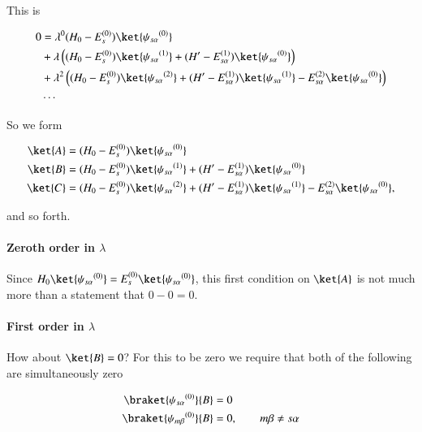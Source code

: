 This is

\begin{equation}\label{eqn:qmTwoL5a:420}
\begin{aligned}
0 &=
\lambda^0
(H_0 - E_s^{(0)}) \ket{{\psi_{s \alpha}}^{(0)}}  \\
&+ \lambda
\left(
(H_0 - E_s^{(0)}) \ket{{\psi_{s \alpha}}^{(1)}} 
+(H' - E_{s \alpha}^{(1)}) \ket{{\psi_{s \alpha}}^{(0)}} 
\right) \\
&+ \lambda^2
\left(
(H_0 - E_s^{(0)}) \ket{{\psi_{s \alpha}}^{(2)}} 
+(H' - E_{s \alpha}^{(1)}) \ket{{\psi_{s \alpha}}^{(1)}} 
-E_{s \alpha}^{(2)} \ket{{\psi_{s \alpha}}^{(0)}} 
\right) \\
&\cdots
\end{aligned}
\end{equation}

So we form

\begin{align}\label{eqn:qmTwoL5a:440}
\ket{A} &=
(H_0 - E_s^{(0)}) \ket{{\psi_{s \alpha}}^{(0)}} \\
\ket{B} &=
(H_0 - E_s^{(0)}) \ket{{\psi_{s \alpha}}^{(1)}} 
+(H' - E_{s \alpha}^{(1)}) \ket{{\psi_{s \alpha}}^{(0)}} \\
\ket{C} &=
(H_0 - E_s^{(0)}) \ket{{\psi_{s \alpha}}^{(2)}} 
+(H' - E_{s \alpha}^{(1)}) \ket{{\psi_{s \alpha}}^{(1)}} 
-E_{s \alpha}^{(2)} \ket{{\psi_{s \alpha}}^{(0)}},
\end{align}

and so forth.

\paragraph{Zeroth order in $\lambda$}

Since $H_0 \ket{{\psi_{s \alpha}}^{(0)}} = E_s^{(0)} \ket{{\psi_{s \alpha}}^{(0)}}$, this first condition on $\ket{A}$ is not much more than a statement that $0 - 0 = 0$.  

\paragraph{First order in $\lambda$}

How about $\ket{B} = 0$?  For this to be zero we require that both of the following are simultaneously zero

\begin{align}\label{eqn:qmTwoL5a:460}
\braket{{\psi_{s \alpha}}^{(0)}}{B} &= 0 \\
\braket{{\psi_{m \beta}}^{(0)}}{B} &= 0, \qquad m \beta \ne s \alpha
\end{align}

